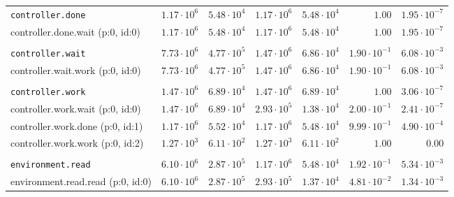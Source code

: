 \begin{table}[htbp]
{\begin{tabular}{lrrrrrr}
\\[-8pt]\texttt{controller.done}              & $1.17 \cdot 10^{6}$ & $5.48 \cdot 10^{4}$ & $1.17 \cdot 10^{6}$ & $5.48 \cdot 10^{4}$ &               $1.00$ & $1.95 \cdot 10^{-7}$ \\
\hspace{3mm}controller.done.wait (p:0, id:0)  & $1.17 \cdot 10^{6}$ & $5.48 \cdot 10^{4}$ & $1.17 \cdot 10^{6}$ & $5.48 \cdot 10^{4}$ &               $1.00$ & $1.95 \cdot 10^{-7}$ \\
\\[-8pt]\texttt{controller.wait}              & $7.73 \cdot 10^{6}$ & $4.77 \cdot 10^{5}$ & $1.47 \cdot 10^{6}$ & $6.86 \cdot 10^{4}$ & $1.90 \cdot 10^{-1}$ & $6.08 \cdot 10^{-3}$ \\
\hspace{3mm}controller.wait.work (p:0, id:0)  & $7.73 \cdot 10^{6}$ & $4.77 \cdot 10^{5}$ & $1.47 \cdot 10^{6}$ & $6.86 \cdot 10^{4}$ & $1.90 \cdot 10^{-1}$ & $6.08 \cdot 10^{-3}$ \\
\\[-8pt]\texttt{controller.work}              & $1.47 \cdot 10^{6}$ & $6.89 \cdot 10^{4}$ & $1.47 \cdot 10^{6}$ & $6.89 \cdot 10^{4}$ &               $1.00$ & $3.06 \cdot 10^{-7}$ \\
\hspace{3mm}controller.work.wait (p:0, id:0)  & $1.47 \cdot 10^{6}$ & $6.89 \cdot 10^{4}$ & $2.93 \cdot 10^{5}$ & $1.38 \cdot 10^{4}$ & $2.00 \cdot 10^{-1}$ & $2.41 \cdot 10^{-7}$ \\
\hspace{3mm}controller.work.done (p:0, id:1)  & $1.17 \cdot 10^{6}$ & $5.52 \cdot 10^{4}$ & $1.17 \cdot 10^{6}$ & $5.48 \cdot 10^{4}$ & $9.99 \cdot 10^{-1}$ & $4.90 \cdot 10^{-4}$ \\
\hspace{3mm}controller.work.work (p:0, id:2)  & $1.27 \cdot 10^{3}$ & $6.11 \cdot 10^{2}$ & $1.27 \cdot 10^{3}$ & $6.11 \cdot 10^{2}$ &               $1.00$ &               $0.00$ \\
\\[-8pt]\texttt{environment.read}             & $6.10 \cdot 10^{6}$ & $2.87 \cdot 10^{5}$ & $1.17 \cdot 10^{6}$ & $5.48 \cdot 10^{4}$ & $1.92 \cdot 10^{-1}$ & $5.34 \cdot 10^{-3}$ \\
\hspace{3mm}environment.read.read (p:0, id:0) & $6.10 \cdot 10^{6}$ & $2.87 \cdot 10^{5}$ & $2.93 \cdot 10^{5}$ & $1.37 \cdot 10^{4}$ & $4.81 \cdot 10^{-2}$ & $1.34 \cdot 10^{-3}$ \\

\end{tabular}}
\end{table}
